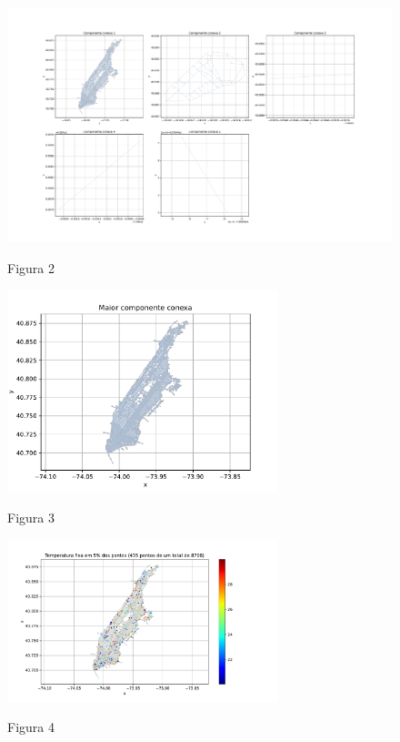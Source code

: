 \documentclass{article}
\begin{document}
    \begin{figure}[ht]
        \centering
        \includegraphics[width=1\textwidth, trim={5.4cm 2.3cm 5.4cm 3.7cm},clip]{../figs/fig2.pdf}
        
        Figura 2
    \end{figure}

    \newpage

    \begin{figure}[ht]
        \centering
        \includegraphics[width=0.7\textwidth, trim={5px 10px 15px 25px},clip]{../figs/fig3.pdf}
        
        Figura 3
    \end{figure}

    \vspace{3cm}

    \begin{figure}[ht]
        \centering
        \includegraphics[width=0.7\textwidth, trim={5px 10px 95px 35px},clip]{../figs/fig4.pdf}
        
        Figura 4
    \end{figure}
\end{document}
